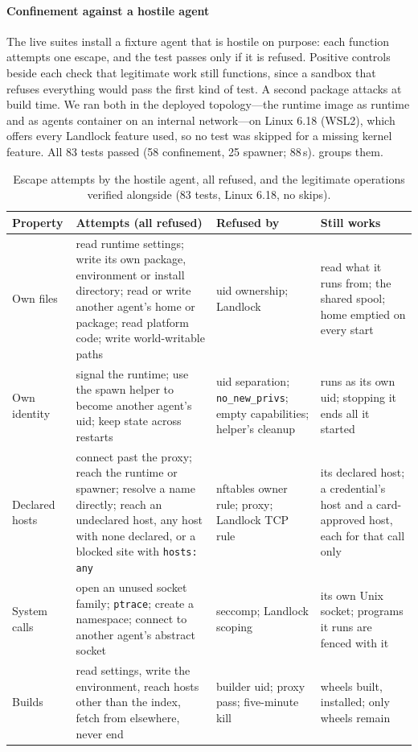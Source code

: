 \documentclass[10pt,twocolumn,a4paper]{article}
\newcommand{\code}[1]{\texttt{\small #1}}
\begin{document}
\paragraph{Confinement against a hostile agent}
The live suites install a fixture agent that is hostile on purpose:
each function attempts one escape, and the test passes only if it is
refused. Positive controls beside each check that legitimate work
still functions, since a sandbox that refuses everything would pass the
first kind of test. A second package attacks at build time. We ran
both in the deployed topology---the runtime image as runtime and as
agents container on an internal network---on Linux 6.18 (WSL2), which
offers every Landlock feature used, so no test was skipped for a
missing kernel feature. All 83 tests passed (58 confinement, 25
spawner; 88\,s).  groups them.

\begin{table}[t]
\centering\small
\caption{Escape attempts by the hostile agent, all refused, and the
legitimate operations verified alongside (83 tests, Linux 6.18, no skips).}
\label{tab:hostile}
\begin{tabularx}{\textwidth}{@{}>{\raggedright\arraybackslash}p{}>{\raggedright\arraybackslash}X>{\raggedright\arraybackslash}p{}>{\raggedright\arraybackslash}p{}@{}}
\toprule
\textbf{Property} & \textbf{Attempts (all refused)} & \textbf{Refused by} & \textbf{Still works} \\
\midrule
Own files & read runtime settings; write its own package, environment or install directory; read or write another agent's home or package; read platform code; write world-writable paths & uid ownership; Landlock & read what it runs from; the shared spool; home emptied on every start \\
Own identity & signal the runtime; use the spawn helper to become another agent's uid; keep state across restarts & uid separation; \code{no\_new\_privs}; empty capabilities; helper's cleanup & runs as its own uid; stopping it ends all it started \\
Declared hosts & connect past the proxy; reach the runtime or spawner; resolve a name directly; reach an undeclared host, any host with none declared, or a blocked site with \code{hosts: any} & nftables owner rule; proxy; Landlock TCP rule & its declared host; a credential's host and a card-approved host, each for that call only \\
System calls & open an unused socket family; \code{ptrace}; create a namespace; connect to another agent's abstract socket & seccomp; Landlock scoping & its own Unix socket; programs it runs are fenced with it \\
Builds & read settings, write the environment, reach hosts other than the index, fetch from elsewhere, never end & builder uid; proxy pass; five-minute kill & wheels built, installed; only wheels remain \\
\bottomrule
\end{tabularx}
\end{table}
\end{document}
